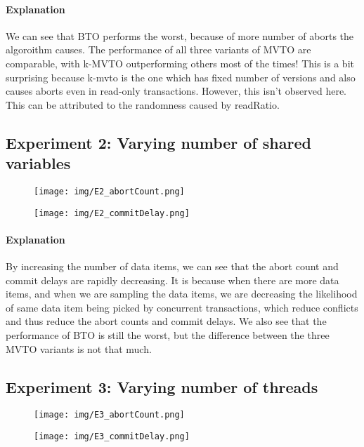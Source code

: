 \documentclass[10pt]{article}
\begin{document}
\paragraph{Explanation} We can see that BTO performs the worst, because of more number of aborts the algoroithm causes. The performance of all three variants of MVTO are comparable, with k-MVTO outperforming others most of the times! This is a bit surprising because k-mvto is the one which has fixed number of versions and also causes aborts even in read-only transactions. However, this isn't observed here. This can be attributed to the randomness caused by readRatio.


\subsection{Experiment 2: Varying number of shared variables}
\begin{figure}[h]
    \centering
    \texttt{[image: img/E2\_abortCount.png]}
\end{figure}

\begin{figure}[h]
    \centering
    \texttt{[image: img/E2\_commitDelay.png]}
\end{figure}
\paragraph{Explanation} 
By increasing the number of data items, we can see that the abort count and commit delays are rapidly decreasing. It is because when there are more data items, and when we are sampling the data items, we are decreasing the likelihood of same data item being picked by concurrent transactions, which reduce conflicts and thus reduce the abort counts and commit delays. We also see that the performance of BTO is still the worst, but the difference between the three MVTO variants is not that much.


\subsection{Experiment 3: Varying number of threads}
\begin{figure}[h]
    \centering
    \texttt{[image: img/E3\_abortCount.png]}
\end{figure}

\begin{figure}[h]
    \centering
    \texttt{[image: img/E3\_commitDelay.png]}
\end{figure}
\end{document}
